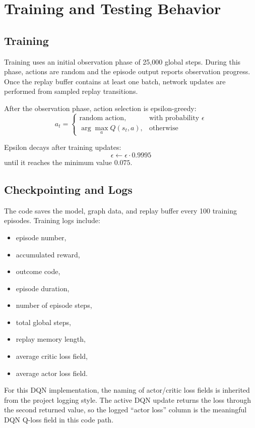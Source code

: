 \documentclass[11pt,a4paper]{article}
\begin{document}
\section{Training and Testing Behavior}

\subsection{Training}

Training uses an initial observation phase of 25,000 global steps. During this phase, actions are random and the episode output reports observation progress. Once the replay buffer contains at least one batch, network updates are performed from sampled replay transitions.

After the observation phase, action selection is epsilon-greedy:
\[
    a_t =
    \begin{cases}
    \text{random action}, & \text{with probability } \epsilon \\
    \arg\max_a Q(s_t,a), & \text{otherwise}
    \end{cases}
\]

Epsilon decays after training updates:
\[
    \epsilon \leftarrow \epsilon \cdot 0.9995
\]
until it reaches the minimum value $0.075$.

\subsection{Checkpointing and Logs}

The code saves the model, graph data, and replay buffer every 100 training episodes. Training logs include:
\begin{itemize}[noitemsep]
    \item episode number,
    \item accumulated reward,
    \item outcome code,
    \item episode duration,
    \item number of episode steps,
    \item total global steps,
    \item replay memory length,
    \item average critic loss field,
    \item average actor loss field.
\end{itemize}

For this DQN implementation, the naming of actor/critic loss fields is inherited from the project logging style. The active DQN update returns the loss through the second returned value, so the logged ``actor loss'' column is the meaningful DQN Q-loss field in this code path.
\end{document}
